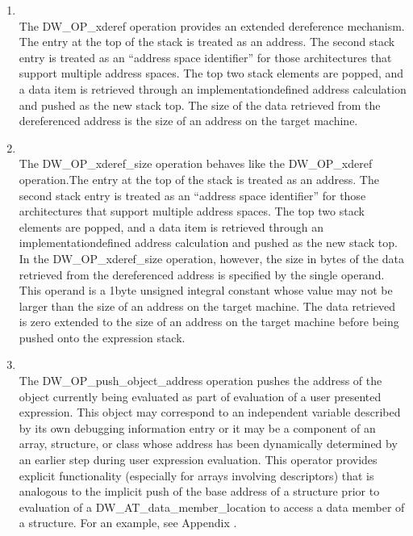 \begin{enumerate}[1]
\item {} \\
The DW\_OP\_xderef operation provides an extended dereference
mechanism. The entry at the top of the stack is treated as an
address. The second stack entry is treated as an “address
space identifier” for those architectures that support
multiple address spaces. The top two stack elements are popped,
and a data item is retrieved through an implementation\dash defined
address calculation and pushed as the new stack top. The size
of the data retrieved from the dereferenced address is the
size of an address on the target machine.

\item {}\\
The DW\_OP\_xderef\_size operation behaves like the
DW\_OP\_xderef operation.The entry at the top of the stack is
treated as an address. The second stack entry is treated as
an “address space identifier” for those architectures
that support multiple address spaces. The top two stack
elements are popped, and a data item is retrieved through an
implementation\dash defined address calculation and pushed as the
new stack top. In the DW\_OP\_xderef\_size operation, however,
the size in bytes of the data retrieved from the dereferenced
address is specified by the single operand. This operand is a
1\dash byte unsigned integral constant whose value may not be larger
than the size of an address on the target machine. The data
retrieved is zero extended to the size of an address on the
target machine before being pushed onto the expression stack.

\item {}\\
The DW\_OP\_push\_object\_address operation pushes the address
of the object currently being evaluated as part of evaluation
of a user presented expression. This object may correspond
to an independent variable described by its own debugging
information entry or it may be a component of an array,
structure, or class whose address has been dynamically
determined by an earlier step during user expression
evaluation.  This operator provides explicit functionality
(especially for arrays involving descriptors) that is analogous
to the implicit push of the base address of a structure prior
to evaluation of a DW\_AT\_data\_member\_location to access a
data member of a structure. For an example, see 
Appendix .


\end{enumerate}
